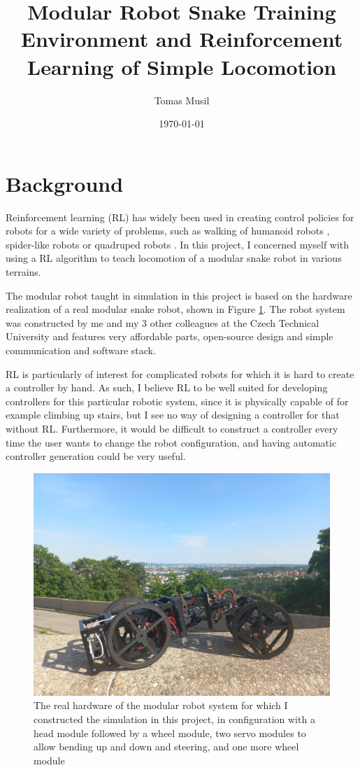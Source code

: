 \documentclass{article}
\author{Tomas Musil}
\date{\today}
\title{Modular Robot Snake Training Environment and Reinforcement Learning of Simple Locomotion}
\begin{document}
\maketitle

\section{Background}
Reinforcement learning (RL) has widely been used in creating control policies for robots for a wide variety of problems, such as walking of humanoid robots \cite{ppo}, spider-like robots \cite{emergence} or quadruped robots \cite{massively}.
In this project, I concerned myself with using a RL algorithm to teach locomotion of a modular snake robot in various terrains.

The modular robot taught in simulation in this project is based on the hardware realization of a real modular snake robot, shown in Figure \ref{fig:hw}.
The robot system was constructed by me and my 3 other colleagues at the Czech Technical University and features very affordable parts, open-source design and simple communication and software stack.

RL is particularly of interest for complicated robots for which it is hard to create a controller by hand. 
As such, I believe RL to be well suited for developing controllers for this particular robotic system, since it is physically capable of for example climbing up stairs, but I see no way of designing a controller for that without RL.
Furthermore, it would be difficult to construct a controller every time the user wants to change the robot configuration, and having automatic controller generation could be very useful.

\begin{figure}[!h]
 \centering 
  \includegraphics[width=.8\textwidth, trim={15cm 10cm 10cm 45cm}, clip]{fig/snek_real.jpg}
  \caption{The real hardware of the modular robot system for which I constructed the simulation in this project, in configuration with a head module followed by a wheel module, two servo modules to allow bending up and down and steering, and one more wheel module}
\label{fig:hw}
\end{figure}
\end{document}
